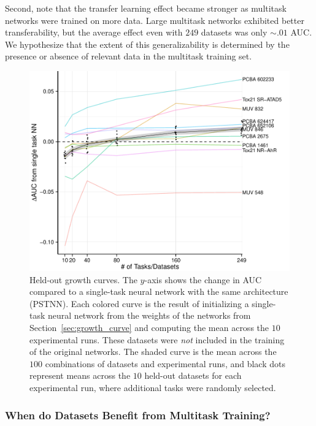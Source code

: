 Second, note that the transfer learning effect became stronger as multitask
networks were trained on more data. Large multitask networks exhibited
better transferability, but the average effect even with $249$ datasets was
only $\sim.01$ AUC.  We hypothesize that the extent of this
generalizability is determined by the presence or absence of relevant data
in the multitask training set.

\begin{figure}[ht]
\vskip 0.2in
\begin{center}
\centerline{\includegraphics[width=\linewidth]{Images/held_out_v2.pdf}}
\caption{Held-out growth curves. The $y$-axis shows the change in AUC
  compared to a single-task neural network with the same architecture
  (PSTNN). Each colored curve is the result of initializing a single-task
  neural network from the weights of the networks from
  Section~\ref{sec:growth_curve} and computing the mean across the $10$
  experimental runs. These datasets were \emph{not} included in the
  training of the original networks. The shaded curve is the mean across
  the $100$ combinations of datasets and experimental runs, and black dots
  represent means across the $10$ held-out datasets for each experimental
  run, where additional tasks were randomly selected.}
\label{fig:held_out}
\end{center}
\vskip -0.2in
\end{figure}

\subsubsection{When do Datasets Benefit from Multitask Training?}

